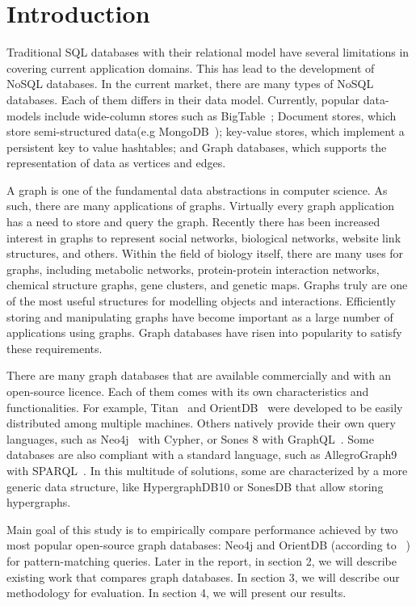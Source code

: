 \section{Introduction}

Traditional SQL databases with their relational model have several limitations in covering current application domains. This has lead to the development of NoSQL databases. In the current market, there are many types of NoSQL databases. Each of them differs in their data model. Currently, popular data-models include wide-column stores such as BigTable~\cite{chang2008bigtable}; Document stores, which store semi-structured data(e.g MongoDB~\cite{chodorow2013mongodb}); key-value stores, which implement a persistent key to value hashtables; and Graph databases, which supports the representation of data as vertices and edges.

A graph is one of the fundamental data abstractions in computer science. As such, there are many applications of graphs. Virtually every graph application has a need to store and query the graph. Recently there has been increased interest in graphs to represent social networks, biological networks, website link structures, and others. Within the field of biology itself, there are many uses for graphs, including metabolic networks, protein-protein interaction networks, chemical structure graphs, gene clusters, and genetic maps. Graphs truly are one of the most useful structures for modelling objects and interactions. Efficiently storing and manipulating graphs have become important as a large number of applications using graphs. Graph databases have risen into popularity to satisfy these requirements.

There are many graph databases that are available commercially and with an open-source licence. Each of them comes with its own characteristics and functionalities. For example, Titan~\cite{jouili2013empirical} and OrientDB~\cite{tesoriero2013getting} were developed to be easily distributed among multiple machines. Others natively provide their own query languages, such as Neo4j~\cite{holzschuher2013performance} with Cypher, or Sones 8 with GraphQL~\cite{vazquez2017improving}. Some databases are also compliant with a standard language, such as AllegroGraph9~\cite{abburu2013format} with SPARQL~\cite{abburu2013format}. In this multitude of solutions, some are characterized by a more generic data structure, like HypergraphDB10 or SonesDB that allow storing hypergraphs. 

Main goal of this study is to empirically compare performance achieved by two most popular open-source graph databases: Neo4j and OrientDB (according to ~\cite{dbranking}) for pattern-matching queries.
Later in the report, in section 2, we will describe existing work that compares graph databases. In section 3, we will describe our methodology for evaluation. In section 4, we will present our results.   




